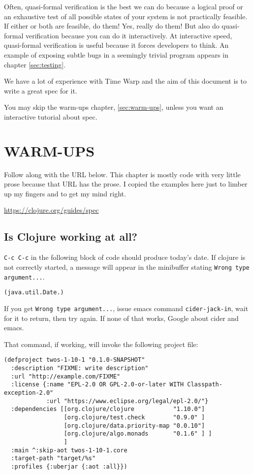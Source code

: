 \documentclass[10pt,oneside,x11names]{article}
\begin{document}
Often, quasi-formal verification is the best we can do because a logical proof
or an exhaustive test of all possible states of your system is not practically
feasible. If either or both are feasible, do them! Yes, really do them! But also
do quasi-formal verification because you can do it interactively. At interactive
speed, quasi-formal verification is useful because it forces
developers to think. An example of exposing subtle bugs in a seemingly trivial
program appears in chapter \ref{sec:testing}.

We have a lot of experience with Time Warp and the aim of this document is to
write a great spec for it.

You may skip the warm-ups chapter, \ref{sec:warm-ups}, unless you want an interactive
tutorial about spec.

\section{WARM-UPS}
\label{sec:org302019c}
\label{sec:warm-ups}

Follow along with the URL below. This chapter is mostly code with very little
prose because that URL has the prose. I copied the examples here just to
limber up my fingers and to get my mind right.

\url{https://clojure.org/guides/spec}

\subsection{Is Clojure working at all?}
\label{sec:org91b6db5}

\texttt{C-c C-c} in the following block of code should produce today's date. If clojure
is not correctly started, a message will appear in the minibuffer stating
\texttt{Wrong type argument...}.

\begin{verbatim}
(java.util.Date.)
\end{verbatim}

If you get \texttt{Wrong type argument...}, issue emacs command \texttt{cider-jack-in}, wait
for it to return, then try again. If none of that works, Google about cider and
emacs.

That command, if working, will invoke the following project file:

\begin{verbatim}
(defproject twos-1-10-1 "0.1.0-SNAPSHOT"
  :description "FIXME: write description"
  :url "http://example.com/FIXME"
  :license {:name "EPL-2.0 OR GPL-2.0-or-later WITH Classpath-exception-2.0"
            :url "https://www.eclipse.org/legal/epl-2.0/"}
  :dependencies [[org.clojure/clojure           "1.10.0"]
                 [org.clojure/test.check        "0.9.0" ]
                 [org.clojure/data.priority-map "0.0.10"]
                 [org.clojure/algo.monads       "0.1.6" ] ]
                 ]
  :main ^:skip-aot twos-1-10-1.core
  :target-path "target/%s"
  :profiles {:uberjar {:aot :all}})
\end{verbatim}
\end{document}
